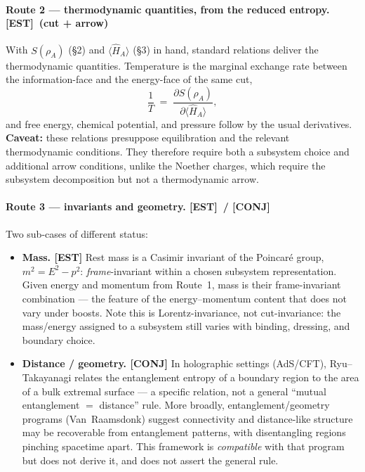\documentclass[11pt]{article}
\newcommand{\est}{\textcolor{teal!70!black}{\textsf{\small[EST]}}}
\newcommand{\fields}{\textcolor{violet}{\textsf{\small[FIELDS]}}}
\newcommand{\asm}{\textcolor{blue!70!black}{\textsf{\small[ASM]}}}
\newcommand{\conj}{\textcolor{orange!80!black}{\textsf{\small[CONJ]}}}
\newcommand{\post}{\textcolor{purple!70!black}{\textsf{\small[POST]}}}
\newcommand{\gap}{\textcolor{red!75!black}{\textsf{\small[GAP]}}}
\def\est{[EST]}\def\fields{[FIELDS]}\def\asm{[ASM]}%
\def\conj{[CONJ]}\def\post{[POST]}\def\gap{[GAP]}%
\theoremstyle{definition}
\theoremstyle{remark}
\begin{document}
\paragraph{Route 2 --- thermodynamic quantities, from the reduced entropy. \est\ (cut + arrow)}
With $S(\rho_A)$ (\S2) and $\langle\hat{H}_A\rangle$ (\S3) in hand, standard relations deliver the thermodynamic quantities. Temperature is the marginal exchange rate between the information-face and the energy-face of the same cut,
\[
  \frac{1}{T} \;=\; \frac{\partial S(\rho_A)}{\partial \langle\hat H_A\rangle},
\]
and free energy, chemical potential, and pressure follow by the usual derivatives. \textbf{Caveat:} these relations presuppose equilibration and the relevant thermodynamic conditions. They therefore require both a subsystem choice and additional arrow conditions, unlike the Noether charges, which require the subsystem decomposition but not a thermodynamic arrow.

\paragraph{Route 3 --- invariants and geometry. \est\ / \conj}
Two sub-cases of different status:
\begin{itemize}[leftmargin=1.4em, itemsep=2pt, topsep=2pt]
  \item \textbf{Mass. \est} Rest mass is a Casimir invariant of the Poincar\'e group, $m^2 = E^2 - p^2$: \emph{frame}-invariant within a chosen subsystem representation. Given energy and momentum from Route~1, mass is their frame-invariant combination --- the feature of the energy--momentum content that does not vary under boosts. Note this is Lorentz-invariance, not cut-invariance: the mass/energy assigned to a subsystem still varies with binding, dressing, and boundary choice.
  \item \textbf{Distance / geometry. \conj} In holographic settings (AdS/CFT), Ryu--Takayanagi relates the entanglement entropy of a boundary region to the area of a bulk extremal surface --- a specific relation, not a general ``mutual entanglement $=$ distance'' rule. More broadly, entanglement/geometry programs (Van~Raamsdonk) suggest connectivity and distance-like structure may be recoverable from entanglement patterns, with disentangling regions pinching spacetime apart. This framework is \emph{compatible} with that program but does not derive it, and does not assert the general rule.
\end{itemize}
\end{document}
